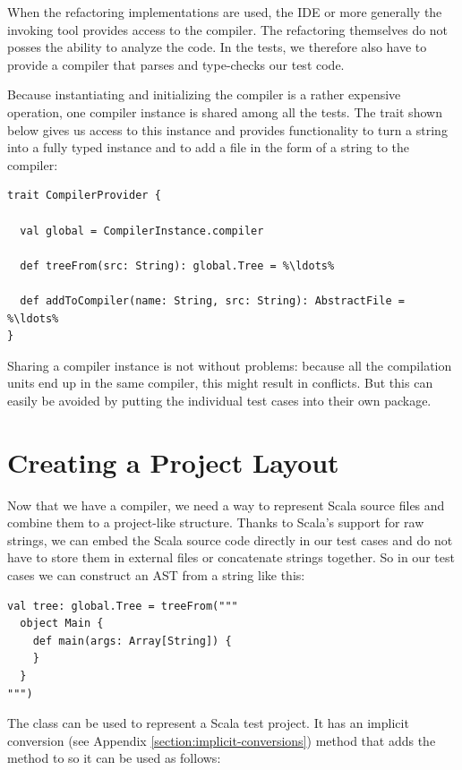\documentclass[10pt,a4paper,oneside]{scrreprt}
\begin{document}
When the refactoring implementations are used, the IDE or more generally the invoking tool provides access to the compiler. The refactoring themselves do not posses the ability to analyze the code. In the tests, we therefore also have to provide a compiler that parses and type-checks our test code.

Because instantiating and initializing the compiler is a rather expensive operation, one compiler instance is shared among all the tests. The  trait shown below gives us access to this instance and provides functionality to turn a string into a fully typed  instance and to add a file in the form of a string to the compiler:

\begin{lstlisting}
trait CompilerProvider {

  val global = CompilerInstance.compiler
    
  def treeFrom(src: String): global.Tree = %\ldots%
  
  def addToCompiler(name: String, src: String): AbstractFile = %\ldots%
}
\end{lstlisting}

Sharing a compiler instance is not without problems: because all the compilation units end up in the same compiler, this might result in conflicts. But this can easily be avoided by putting the individual test cases into their own package.

\section{Creating a Project Layout}

Now that we have a compiler, we need a way to represent Scala source files and combine them to a project-like structure. Thanks to Scala's support for raw strings, we can embed the Scala source code directly in our test cases and do not have to store them in external files or concatenate strings together. So in our test cases we can construct an AST from a string like this:

\begin{lstlisting}
val tree: global.Tree = treeFrom("""
  object Main {
    def main(args: Array[String]) {
    }
  }
""")
\end{lstlisting}

The  class can be used to represent a Scala test project. It has an implicit conversion (see Appendix \vref{section:implicit-conversions}) method that adds the  method to  so it can be used as follows:
\end{document}
